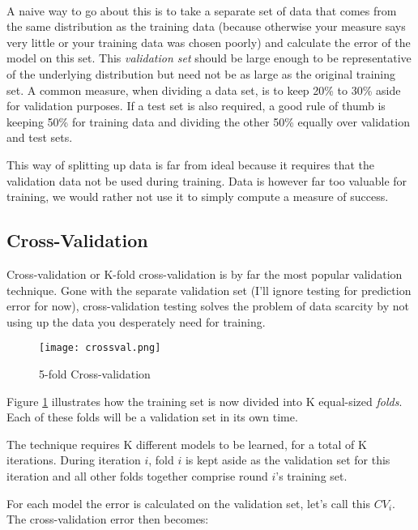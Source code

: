 \paragraph{}
A naive way to go about this
is to take a separate set of data
that comes from the same distribution
as the training data
(because otherwise your measure says very little
or your training data was chosen poorly)
and calculate the error of the model on this set.
This \textit{validation set} should be large enough
to be representative of the underlying distribution
but need not be as large as the original training set.
A common measure,
when dividing a data set,
is to keep 20\% to 30\% aside
for validation purposes.
If a test set is also required,
a good rule of thumb is keeping
50\% for training data
and dividing the other 50\%
equally over validation and test sets.

This way of splitting up data is far from ideal
because it requires that the validation data
not be used during training.
Data is however far too valuable for training,
we would rather not use it to simply
compute a measure of success.

\subsection{Cross-Validation}
Cross-validation or K-fold cross-validation
is by far the most popular validation technique.
Gone with the separate validation set
(I'll ignore testing for prediction error for now),
cross-validation testing solves
the problem of data scarcity by not using up
the data you desperately need for training.

\begin{figure}[h]
\center
\texttt{[image: crossval.png]}
\caption{
5-fold Cross-validation
\parencite{Zhang2011}
}
\label{fig:crossval}
\end{figure}

Figure \ref{fig:crossval} illustrates
how the training set is now divided into
K equal-sized \textit{folds}.
Each of these folds will be a validation set
in its own time.

The technique requires K
different models to be learned,
for a total of K iterations.
During iteration $i$,
fold $i$ is kept aside
as the validation set for this iteration
and all other folds together comprise
round $i$'s training set.

For each model the error is calculated on the validation
set, let's call this $\textit{CV}_i$.
The cross-validation error then becomes:

